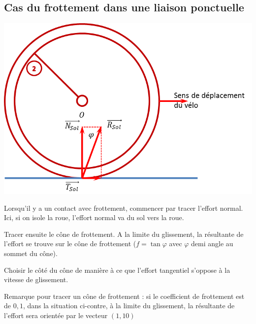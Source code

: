\documentclass[11pt,oneside]{article}
\begin{document}
\subsection{Cas du frottement dans une liaison ponctuelle}
\begin{minipage}[c]{.3\linewidth}
\begin{center}
\includegraphics[width=.95\textwidth]{png/2_frott}
\end{center}
\end{minipage}
\hfill
\begin{minipage}[c]{.65\linewidth}
Lorsqu'il y a un contact avec frottement, commencer par tracer l'effort normal. Ici, si on isole la roue, l'effort normal va du sol vers la roue. 

Tracer ensuite le cône de frottement. A la limite du glissement, la résultante de l'effort se trouve sur le cône de frottement ($f=\tan\varphi$ avec $\varphi$ demi angle au sommet du cône). 

Choisir le côté du cône de manière à ce que l'effort tangentiel s'oppose à la vitesse de glissement. 

Remarque pour tracer un cône de frottement : si le coefficient de frottement est de $0,1$, dans la situation ci-contre, à la limite du glissement, la résultante de l'effort sera orientée par le vecteur $(1,10)$
\end{minipage}

\end{document}
